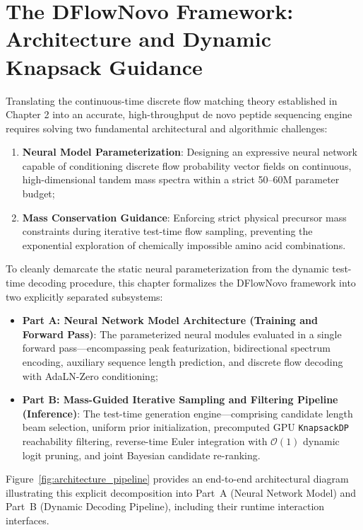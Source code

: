 \chapter{The DFlowNovo Framework: Architecture and Dynamic Knapsack Guidance}

Translating the continuous-time discrete flow matching theory established in Chapter 2 into an accurate, high-throughput de novo peptide sequencing engine requires solving two fundamental architectural and algorithmic challenges:
\begin{enumerate}
    \item \textbf{Neural Model Parameterization}: Designing an expressive neural network capable of conditioning discrete flow probability vector fields on continuous, high-dimensional tandem mass spectra within a strict 50--60M parameter budget;
    \item \textbf{Mass Conservation Guidance}: Enforcing strict physical precursor mass constraints during iterative test-time flow sampling, preventing the exponential exploration of chemically impossible amino acid combinations.
\end{enumerate}

To cleanly demarcate the static neural parameterization from the dynamic test-time decoding procedure, this chapter formalizes the DFlowNovo framework into two explicitly separated subsystems:
\begin{itemize}
    \item \textbf{Part A: Neural Network Model Architecture (Training and Forward Pass)}: The parameterized neural modules evaluated in a single forward pass—encompassing peak featurization, bidirectional spectrum encoding, auxiliary sequence length prediction, and discrete flow decoding with AdaLN-Zero conditioning;
    \item \textbf{Part B: Mass-Guided Iterative Sampling and Filtering Pipeline (Inference)}: The test-time generation engine—comprising candidate length beam selection, uniform prior initialization, precomputed GPU \texttt{KnapsackDP} reachability filtering, reverse-time Euler integration with $\mathcal{O}(1)$ dynamic logit pruning, and joint Bayesian candidate re-ranking.
\end{itemize}

Figure~\ref{fig:architecture_pipeline} provides an end-to-end architectural diagram illustrating this explicit decomposition into Part~A (Neural Network Model) and Part~B (Dynamic Decoding Pipeline), including their runtime interaction interfaces.

